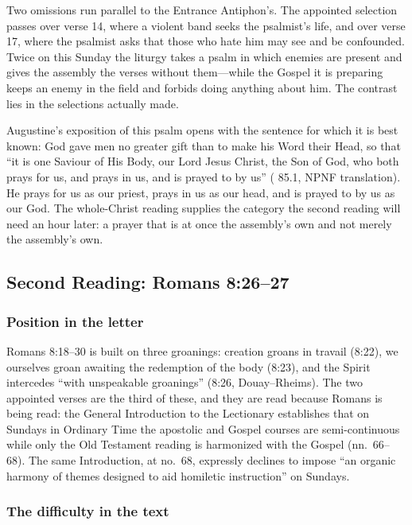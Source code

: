 Two omissions run parallel to the Entrance Antiphon's. The appointed selection passes over verse 14, where a violent band
seeks the psalmist's life, and over verse 17, where the psalmist asks that
those who hate him may see and be confounded. Twice on this Sunday the
liturgy takes a psalm in which enemies are present and gives the assembly the
verses without them---while the Gospel it is preparing keeps an enemy in the
field and forbids doing anything about him. The contrast lies in the
selections actually made.

Augustine's exposition of this psalm opens with the sentence for which it is
best known: God gave men no greater gift
than to make his Word their Head, so that ``it is one Saviour of His Body, our
Lord Jesus Christ, the Son of God, who both prays for us, and prays in us, and
is prayed to by us'' ( 85.1, NPNF translation).
He prays for us as our priest, prays in us as our head, and is prayed to by us
as our God. The whole-Christ reading supplies the category the second
reading will need an hour later: a prayer that is at once
the assembly's own and not merely the assembly's own.

\subsection*{Second Reading: Romans 8:26--27}

\subsubsection*{Position in the letter}

Romans 8:18--30 is built on three groanings: creation groans in travail
(8:22), we ourselves groan awaiting the redemption of the body (8:23), and the
Spirit intercedes ``with unspeakable groanings'' (8:26, Douay--Rheims). The two
appointed verses are the third of these, and they are read because Romans is
being read: the General Introduction to the Lectionary establishes that on
Sundays in Ordinary Time the apostolic and Gospel courses are semi-continuous
while only the Old Testament reading is harmonized with the Gospel (nn.\
66--68). The same Introduction, at no.\ 68, expressly declines to impose ``an
organic harmony of themes designed to aid homiletic instruction'' on Sundays.

\subsubsection*{The difficulty in the text}

